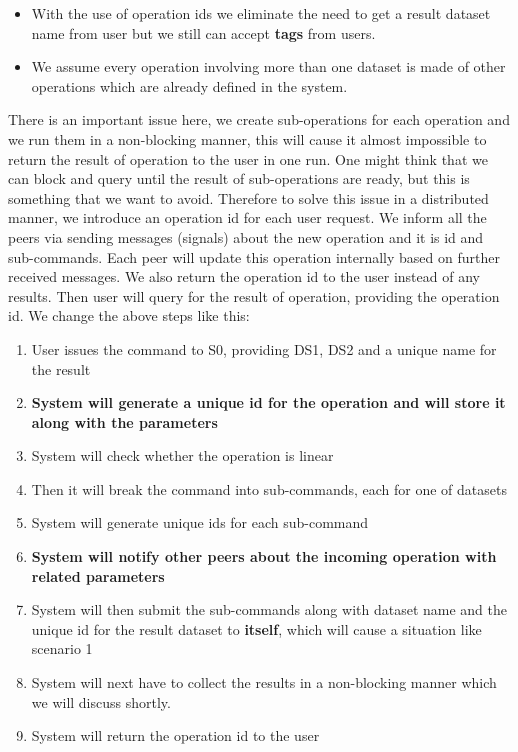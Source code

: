 \begin{itemize}
\item With the use of operation ids we eliminate the need to get a result dataset name from user but we still can accept \textbf{tags} from users.
\end{itemize}

\begin{itemize}
\item We assume every operation involving more than one dataset is made of other operations which are already defined in the system.
\end{itemize}

There is an important issue here, we create sub-operations for each operation and we run them in a non-blocking manner, this will
cause it almost impossible to return the result of operation to the user in one run. One might think that we can block and query
until the result of sub-operations are ready, but this is something that we want to avoid. Therefore to solve this issue in a 
distributed manner, we introduce an operation id for each user request. We inform all the peers via sending messages (signals) about
the new operation and it is id and sub-commands. Each peer will update this operation internally based on further received messages.
We also return the operation id to the user instead of any results. Then user will query for the result of operation, providing the 
operation id. We change the above steps like this:

\begin{enumerate}
\item User issues the command to S0, providing DS1, DS2 and a unique name for the result
\item \textbf{System will generate a unique id for the operation and will store it along with the parameters}
\item System will check whether the operation is linear
\item Then it will break the command into sub-commands, each for one of datasets
\item System will generate unique ids for each sub-command
\item \textbf{System will notify other peers about the incoming operation with related parameters}
\item System will then submit the sub-commands along with dataset name and the unique id for the result dataset
to \textbf{itself}, which will cause a situation like scenario 1
\item System will next have to collect the results in a non-blocking manner which we will discuss shortly.
\item System will return the operation id to the user
\end{enumerate}

